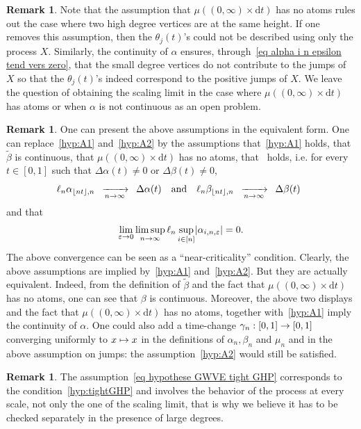 \documentclass[10pt]{amsart}
\theoremstyle{definition}\newtheorem{defi}[theo]{Definition}\newtheorem{rema}[theo]{Remark}\newtheorem{exam}[theo]{Example}\newtheorem{exem}[theo]{Example}\newtheorem{nota}[theo]{Notation}
\newcommand{\e}{\varepsilon}
\newcommand{\cv}[1][n]{\enskip\xrightarrow[#1 \to \infty]{}\enskip}
\newcommand{\rmd}{\mathrm{d}}
\newcommand{\1}{\mathbbm{1}}
\let\originalleft\left
\let\originalright\right
\renewcommand{\left}{\mathopen{}\mathclose\bgroup\originalleft}
\renewcommand{\right}{\aftergroup\egroup\originalright}
\renewcommand*{\to}{\mathchoice{\longrightarrow}{\rightarrow}{\rightarrow}{\rightarrow}}
\let\oldmapsto\mapsto
\renewcommand*{\mapsto}{\mathchoice{\longmapsto}{\oldmapsto}{\oldmapsto}{\oldmapsto}}
\begin{document}
\begin{rema}\label{remarque pas de grands degrés à la meme hauteur}
Note that the assumption that $\mu((0,\infty)\times \rmd t)$ has no atoms rules out the case where two high degree vertices are at the same height. If one removes this assumption, then the $\theta_j(t)$'s could not be described using only the process $X$. {Similarly, the continuity of $\alpha$ ensures, through~\eqref{eq alpha i n epsilon tend vers zero}, that the small degree vertices do not contribute to the jumps of $X$ so that the $\theta_j(t)$'s indeed correspond to the positive jumps of $X$.} {We leave the question of obtaining the scaling limit in the case where $\mu((0,\infty)\times \rmd t)$ has atoms or when $\alpha$ is not continuous as an open problem.}
\end{rema}


\begin{rema}
One can present the above assumptions in the equivalent form. One can replace~\ref{hyp:A1} and~\ref{hyp:A2} by the assumptions that~\ref{hyp:A1} holds, that $\widetilde{\beta}$ is continuous, that $\mu((0,\infty)\times \rmd t)$ has no atoms, that~\cite[Assumption~(A2)]{BS15} holds, i.e. for every $t \in [0,1]$ such that $\Delta \alpha(t) \neq 0$ or $\Delta\beta(t) \neq 0$,
\[
{\ell_n} \alpha_{\lfloor n t \rfloor, n} \cv[n] \Delta \alpha (t)
\quad \text{and} \quad {\ell_n} \beta_{\lfloor n t \rfloor, n}\cv[n] \Delta \beta (t) \enskip
\]
and that
\[
\lim_{\e \to 0} \limsup_{n\to \infty} \ell_n \sup_{i \in [n]} \left| \alpha_{i,n,\e} \right| =0.
\]
The above convergence can be seen as a ``near-criticality'' condition. Clearly, the above assumptions are implied by~\ref{hyp:A1} and~\ref{hyp:A2}. But they are actually equivalent. Indeed, from the definition of $\widetilde{\beta}$ and the fact that $\mu((0,\infty)\times \rmd t)$ has no atoms, one can see that $\beta$ is continuous. Moreover, the above two displays and the fact that $\mu((0,\infty)\times \rmd t)$ has no atoms, together with~\ref{hyp:A1} imply the continuity of $\alpha$. One could also add a time-change $\gamma_n : [0,1]\to [0,1]$ converging uniformly to $x\mapsto x$ in the definitions of $\alpha_n, \beta_n$ and $\mu_n$ and in the above assumption on jumps: the assumption~\ref{hyp:A2} would still be satisfied.
\end{rema}

\begin{rema}
The assumption~\eqref{eq hypothese GWVE tight GHP} corresponds to the condition~\ref{hyp:tightGHP} and involves the behavior of the process at every scale, not only the one of the scaling limit, that is why we believe it has to be checked separately in the presence of large degrees.
\end{rema}
\end{document}
